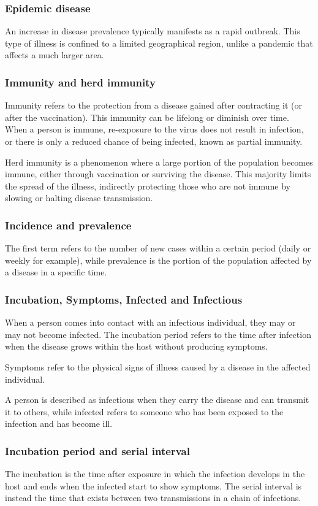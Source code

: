 \subsubsection{Epidemic disease} An increase in disease prevalence typically manifests as a rapid outbreak. This type of illness is confined to a limited geographical region, unlike a pandemic that affects a much larger area.

\subsubsection{Immunity and herd immunity}
Immunity refers to the protection from a disease gained after contracting it (or after the vaccination). This immunity can be lifelong or diminish over time. When a person is immune, re-exposure to the virus does not result in infection, or there is only a reduced chance of being infected, known as partial immunity.

Herd immunity is a phenomenon where a large portion of the population becomes immune, either through vaccination or surviving the disease. This majority limits the spread of the illness, indirectly protecting those who are not immune by slowing or halting disease transmission.

\subsubsection{Incidence and prevalence} The first term refers to the number of new cases within a certain period (daily or weekly for example), while prevalence is the portion of the population affected by a disease in a specific time.

\subsubsection{Incubation, Symptoms, Infected and Infectious}  When a person comes into contact with an infectious individual, they may or may not become infected. The incubation period refers to the time after infection when the disease grows within the host without producing symptoms.

Symptoms refer to the physical signs of illness caused by a disease in the affected individual.

A person is described as infectious when they carry the disease and can transmit it to others, while infected refers to someone who has been exposed to the infection and has become ill.

\subsubsection{Incubation period and serial interval} The incubation is the time after exposure in which the infection develops in the host and ends when the infected start to show symptoms. The serial interval is instead the time that exists between two transmissions in a chain of infections. 



